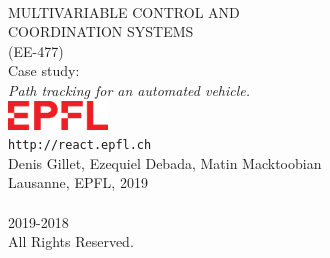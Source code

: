 \pagestyle{empty}
{\ \vspace{50px}\\ \centering \huge{MULTIVARIABLE CONTROL AND\\ COORDINATION SYSTEMS\\ (EE-477)}\\}
{\centering \vspace{20px}\large{Case study:\\}\Large{\emph{Path tracking for an automated vehicle.}}\\ \vspace{250px}}
%
\large{\centering
\noindent\includegraphics[width = 100px]{./_imags/EPFL-Logo}\\
%
\vspace{20px}
\noindent\texttt{http://react.epfl.ch}\\
%
\vspace{20px}
\noindent Denis Gillet, Ezequiel Debada, Matin Macktoobian\\
%
\noindent Lausanne, EPFL, 2019\\
}\newpage
%
{\centering\ \ \\ \vspace{550px} \raisebox{1px}{\textcopyright} 2019-2018
 \\ 
%
\noindent All Rights Reserved.\\}